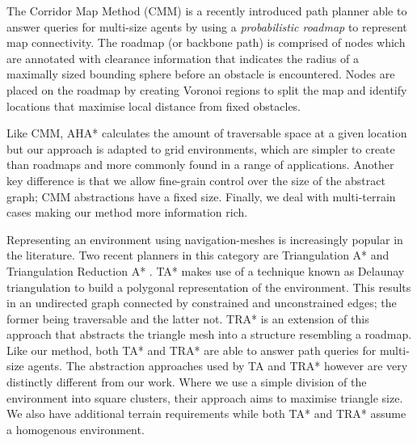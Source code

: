 \indent The Corridor Map Method (CMM) \cite{geraerts07} is a recently introduced path planner able to answer queries for multi-size agents by using a \emph{probabilistic roadmap} to represent map connectivity. 
The roadmap (or backbone path) is comprised of nodes which are annotated with clearance information that indicates the radius of a maximally sized bounding sphere before an obstacle is encountered. 
Nodes are placed on the roadmap by creating Voronoi regions to split the map and identify locations that maximise local distance from fixed obstacles. 
\par \indent
Like CMM, AHA* calculates the amount of traversable space at a given location but our approach is adapted to grid environments, which are simpler to create than roadmaps and more commonly found in a range of applications. 
Another key difference is that we allow fine-grain control over the size of the abstract graph; CMM abstractions have a fixed size.
Finally, we deal with multi-terrain cases making our method more information rich. 
\par \indent 
Representing an environment using navigation-meshes is increasingly popular in the literature. 
Two recent planners in this category are Triangulation A* and Triangulation Reduction A* \cite{demyen07}. 
TA* makes use of a technique known as Delaunay triangulation to build a polygonal representation of the environment. 
This results in an undirected graph connected by constrained and unconstrained edges; the former being traversable and the latter not. 
TRA* is an extension of this approach that abstracts the triangle mesh into a structure resembling a roadmap. 
Like our method, both TA* and TRA* are able to answer path queries for multi-size agents. 
The abstraction approaches used by TA and TRA* however are very distinctly different from our work. 
Where we use a simple division of the environment into square clusters, their approach aims to maximise triangle size. 
We also have additional terrain requirements while both TA* and TRA* assume a homogenous environment.

